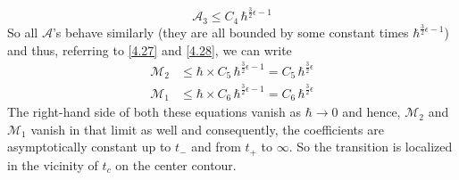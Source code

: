 \documentclass[12pt,a4paper]{article}
\begin{document}
	\begin{equation}
		\mathcal{A}_{3} \leq C_{4}\, \hbar^{\frac{3}{2}\epsilon - 1}
	\end{equation}
	So all $\mathcal{A}$'s behave similarly (they are all bounded by some constant times $\hbar^{\frac{3}{2}\epsilon - 1}$) and thus, referring to \eqref{4.27} and \eqref{4.28}, we can write
	\begin{align}
		\mathcal{M}_{2} &\leq \hbar \times C_{5}\, \hbar^{\frac{3}{2}\epsilon - 1} = C_{5}\, \hbar^{\frac{3}{2}\epsilon} \label{4.38} \\
		\mathcal{M}_{1} &\leq \hbar \times C_{6}\, \hbar^{\frac{3}{2}\epsilon - 1} = C_{6}\, \hbar^{\frac{3}{2}\epsilon} \label{4.39}
	\end{align}
	The right-hand side of both these equations vanish as $\hbar \rightarrow 0$ and hence, $\mathcal{M}_{2}$ and $\mathcal{M}_{1}$ vanish in that limit as well and consequently, the coefficients are asymptotically constant up to $t_{-}$ and from $t_{+}$ to $\infty$. So the transition is localized in the vicinity of $t_{c}$ on the center contour.
	
\end{document}
